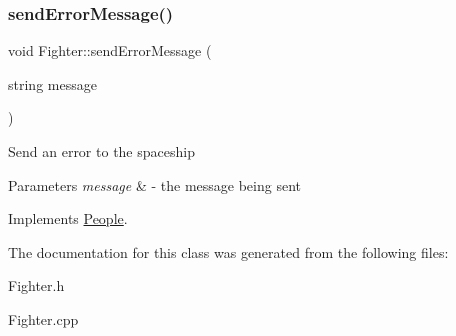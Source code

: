 \subsubsection{\texorpdfstring{send\+Error\+Message()}{sendErrorMessage()}}
{\footnotesize\ttfamily void Fighter\+::send\+Error\+Message (\begin{DoxyParamCaption}\item[{string}]{message }\end{DoxyParamCaption})\hspace{0.3cm}{\ttfamily [virtual]}}

Send an error to the spaceship 
\begin{DoxyParams}{Parameters}
{\em message} & -\/ the message being sent \\
\hline
\end{DoxyParams}


Implements \hyperlink{classPeople_a572a35170f61d1848eb04b65baafb057}{People}.



The documentation for this class was generated from the following files\+:\begin{DoxyCompactItemize}
\item 
Fighter.\+h\item 
Fighter.\+cpp\end{DoxyCompactItemize}
